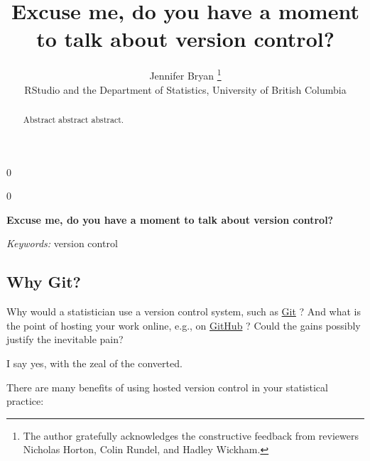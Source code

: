 \documentclass[12pt]{article}
\newcommand{\blind}{0}
\begin{document}
\def\spacingset#1{\renewcommand{\baselinestretch}%
{#1}\small\normalsize} \spacingset{1}



\blind
{
  \title{\bf Excuse me, do you have a moment to talk about version control?}

  \author{
        Jennifer Bryan \thanks{The author gratefully acknowledges the constructive feedback from
reviewers Nicholas Horton, Colin Rundel, and Hadley Wickham.} \\
    RStudio and the Department of Statistics, University of British Columbia\\
      }
  \maketitle
} \fi

\blind
{
  \bigskip
  \bigskip
  \bigskip
  \begin{center}
    {\LARGE\bf Excuse me, do you have a moment to talk about version control?}
  \end{center}
  \medskip
} \fi

\bigskip
\begin{abstract}
Abstract abstract abstract.
\end{abstract}

\noindent%
{\it Keywords:} version control
\vfill

\newpage
\spacingset{1.45} %

\subsection{Why Git?}\label{why-git}

Why would a statistician use a version control system, such as
\href{http://git-scm.com}{Git} \citep{git}? And what is the point of
hosting your work online, e.g., on \href{https://github.com}{GitHub}
\citep{github}? Could the gains possibly justify the inevitable pain?

I say yes, with the zeal of the converted.

There are many benefits of using hosted version control in your
statistical practice:
\end{document}
